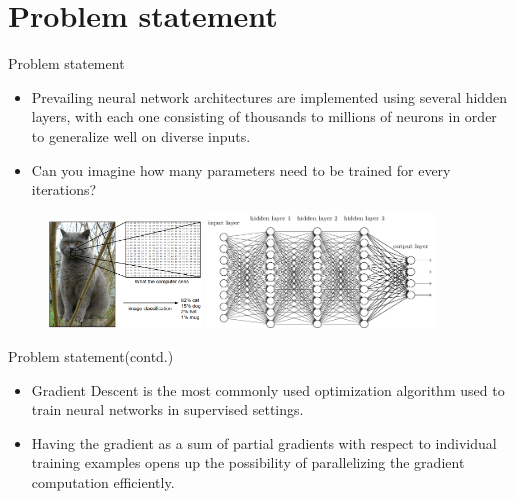 \section{Problem statement}

\begin{frame}{Problem statement}
    \begin{itemize}
          \item {
            Prevailing neural network architectures are implemented using several hidden layers, with each one consisting of thousands to millions of neurons in order to generalize well on diverse inputs. 
          }
          \item {Can you imagine how many parameters need to be trained for every iterations?
          }
  \end{itemize}
 
  
\begin{figure}[!tbp]
  \begin{minipage}[b]{0.4\textwidth}
    \includegraphics[width=1.6in]{classify.png}
  \end{minipage}
  \begin{minipage}[b]{0.4\textwidth}
    \includegraphics[width=2.4in]{many_nn.png}
  \end{minipage}
\end{figure}

\end{frame}


\begin{frame}{Problem statement(contd.)}
	\begin{itemize}
	\item {Gradient Descent is the most commonly used optimization algorithm used to train neural networks in supervised settings.}
	\item {Having the gradient as a sum of partial gradients with respect to individual training examples opens up the possibility of parallelizing the gradient computation efficiently.}

	\end{itemize}

\end{frame}